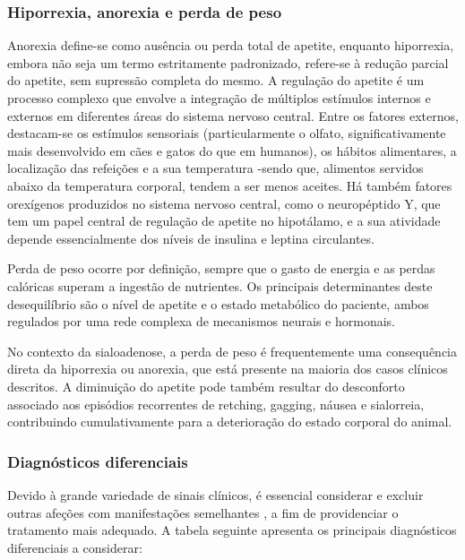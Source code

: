 \subsubsection{Hiporrexia, anorexia e perda de peso}

Anorexia define-se como ausência ou perda total de apetite, enquanto hiporrexia, embora não seja um termo estritamente padronizado, refere-se à redução parcial do apetite, sem supressão completa do mesmo. \cite{Delaney2006}
A regulação do apetite é um processo complexo que envolve a integração de múltiplos estímulos internos e externos em diferentes áreas do sistema nervoso central. \cite{canine_gastro_2013}Entre os fatores externos, destacam-se os estímulos sensoriais (particularmente o olfato, significativamente mais desenvolvido em cães e gatos do que em humanos), os hábitos alimentares, a localização das refeições e a sua temperatura -sendo que, alimentos servidos abaixo da temperatura corporal, tendem a ser menos aceites. \cite{_canine_gastro_2013}
Há também fatores orexígenos produzidos no sistema nervoso central, como o neuropéptido Y, que tem um papel central de regulação de apetite no hipotálamo, e a sua atividade depende essencialmente dos níveis de insulina e leptina circulantes. \cite{canine_gastro_2013}


Perda de peso ocorre por definição, sempre que o gasto de energia e as perdas calóricas superam a ingestão de nutrientes. Os principais determinantes deste desequilíbrio são o nível de apetite e o estado metabólico do paciente, ambos regulados por uma rede complexa de mecanismos neurais e hormonais. \cite{_canine_gastro_2013}


No contexto da sialoadenose, a perda de peso é frequentemente uma consequência direta da hiporrexia ou anorexia, que está presente na maioria dos casos clínicos descritos. A diminuição do apetite pode também resultar do desconforto associado aos episódios recorrentes de retching, gagging, náusea e sialorreia, contribuindo cumulativamente para a deterioração do estado corporal do animal.

\subsubsection{Diagnósticos diferenciais}

Devido à grande variedade de sinais clínicos, é essencial considerar e excluir outras afeções com manifestações semelhantes \cite{Han2016}, a fim de providenciar o tratamento mais adequado. A tabela seguinte apresenta os principais diagnósticos diferenciais a considerar:

